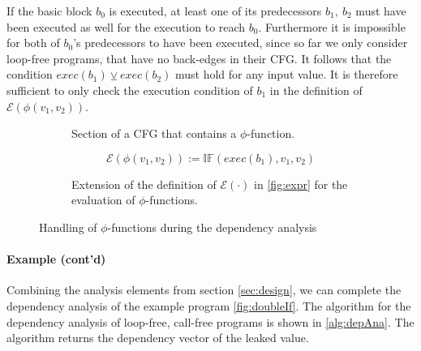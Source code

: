 If the basic block $b_0$ is executed, at least one of its predecessors $b_1, \: b_2$ must have been executed as well for the execution to reach $b_0$. Furthermore it is impossible for both of $b_0$'s predecessors to have been executed, since so far we only consider loop-free programs, that have no back-edges in their CFG. It follows that the condition $exec(b_1) \veebar exec(b_2)$ must hold for any input value. It is therefore sufficient to only check the execution condition of $b_1$ in the definition of $\mathcal{E}(\phi(v_1, v_2))$.

\begin{figure}
\begin{subfigure}[t]{.4\textwidth}
    \centering
    \caption{Section of a CFG that contains a $\phi$-function.}
    \label{fig:phi}
\end{subfigure}
\hfill
\begin{subfigure}[t]{.5\textwidth}
    \begin{equation*}
\mathcal{E}(\phi(v_1, v_2)) := \mathbb{IF}(exec(b_1), v_1, v_2)
\end{equation*}
\caption{Extension of the definition of $\mathcal{E}(\cdot)$ in \ref{fig:expr} for the evaluation of $\phi$-functions.}\label{fig:exprPhi}
\end{subfigure}
\caption{Handling of $\phi$-functions during the dependency analysis}
\end{figure}

\paragraph{Example (cont'd)}
Combining the analysis elements from section \ref{sec:design}, we can complete the dependency analysis of the example program \ref{fig:doubleIf}. The algorithm for the dependency analysis of loop-free, call-free programs is shown in \ref{alg:depAna}. The algorithm returns the dependency vector of the leaked value.

